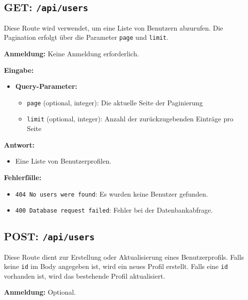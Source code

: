 \documentclass[a4paper,12pt]{article}
\begin{document}
\subsection{GET: \texttt{/api/users}}

Diese Route wird verwendet, um eine Liste von Benutzern abzurufen. Die
Pagination erfolgt über die Parameter \texttt{page} und \texttt{limit}.

\textbf{Anmeldung:} Keine Anmeldung erforderlich.

\textbf{Eingabe:}
\begin{itemize}
    \item \textbf{Query-Parameter:}
    \begin{itemize}
        \item \texttt{page} (optional, integer):
            Die aktuelle Seite der Paginierung
        \item \texttt{limit} (optional, integer):
            Anzahl der zurückzugebenden Einträge pro Seite
    \end{itemize}
\end{itemize}

\textbf{Antwort:}
\begin{itemize}
    \item Eine Liste von Benutzerprofilen.
\end{itemize}

\textbf{Fehlerfälle:}
\begin{itemize}
    \item \texttt{404 No users were found}:
        Es wurden keine Benutzer gefunden.
    \item \texttt{400 Database request failed}:
        Fehler bei der Datenbankabfrage.
\end{itemize}

\subsection{POST: \texttt{/api/users}}

Diese Route dient zur Erstellung oder Aktualisierung eines Benutzerprofils.
Falls keine \texttt{id} im Body angegeben ist, wird ein neues Profil erstellt.
Falls eine \texttt{id} vorhanden ist, wird das bestehende Profil aktualisiert.

\textbf{Anmeldung:} Optional.
\end{document}
